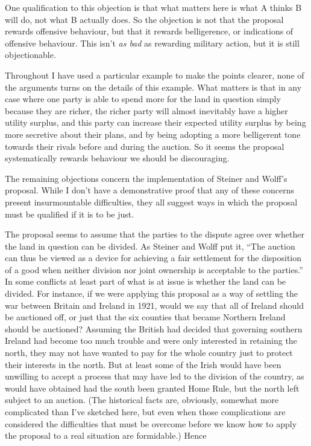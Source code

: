 \documentclass[
  10pt,
  letterpaper,
  DIV=11,
  numbers=noendperiod,
  twoside]{scrartcl}
\begin{document}
One qualification to this objection is that what matters here is what A
thinks B will do, not what B actually does. So the objection is not that
the proposal rewards offensive behaviour, but that it rewards
belligerence, or indications of offensive behaviour. This isn't \emph{as
bad} as rewarding military action, but it is still objectionable.

Throughout I have used a particular example to make the points clearer,
none of the arguments turns on the details of this example. What matters
is that in any case where one party is able to spend more for the land
in question simply because they are richer, the richer party will almost
inevitably have a higher utility surplus, and this party can increase
their expected utility surplus by being more secretive about their
plans, and by being adopting a more belligerent tone towards their
rivals before and during the auction. So it seems the proposal
systematically rewards behaviour we should be discouraging.

The remaining objections concern the implementation of Steiner and
Wolff's proposal. While I don't have a demonstrative proof that any of
these concerns present insurmountable difficulties, they all suggest
ways in which the proposal must be qualified if it is to be just.

The proposal seems to assume that the parties to the dispute agree over
whether the land in question can be divided. As Steiner and Wolff put
it, ``The auction can thus be viewed as a device for achieving a fair
settlement for the disposition of a good when neither division nor joint
ownership is acceptable to the parties.'' In some conflicts at least
part of what is at issue is whether the land can be divided. For
instance, if we were applying this proposal as a way of settling the war
between Britain and Ireland in 1921, would we say that all of Ireland
should be auctioned off, or just that the six counties that became
Northern Ireland should be auctioned? Assuming the British had decided
that governing southern Ireland had become too much trouble and were
only interested in retaining the north, they may not have wanted to pay
for the whole country just to protect their interests in the north. But
at least some of the Irish would have been unwilling to accept a process
that may have led to the division of the country, as would have obtained
had the south been granted Home Rule, but the north left subject to an
auction. (The historical facts are, obviously, somewhat more complicated
than I've sketched here, but even when those complications are
considered the difficulties that must be overcome before we know how to
apply the proposal to a real situation are formidable.) Hence
\end{document}
